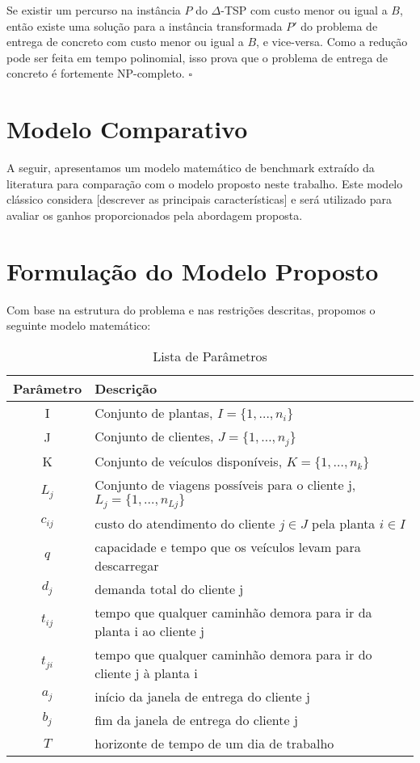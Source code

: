 Se existir um percurso na inst\^{a}ncia $P$ do $\Delta$-TSP com custo menor ou igual a $B$, ent\~{a}o existe uma solu\c{c}\~{a}o para a inst\^{a}ncia transformada $P'$ do problema de entrega de concreto com custo menor ou igual a $B$, e vice-versa. Como a redu\c{c}\~{a}o pode ser feita em tempo polinomial, isso prova que o problema de entrega de concreto \'{e} fortemente NP-completo. \hfill $\square$

\section*{Modelo Comparativo}

A seguir, apresentamos um modelo matem\'{a}tico de benchmark extra\'{i}do da literatura para compara\c{c}\~{a}o com o modelo proposto neste trabalho. Este modelo cl\'{a}ssico considera [descrever as principais caracter\'{i}sticas] e ser\'{a} utilizado para avaliar os ganhos proporcionados pela abordagem proposta.


\section*{Formula\c{c}\~{a}o do Modelo Proposto}

Com base na estrutura do problema e nas restri\c{c}\~{o}es descritas, propomos o seguinte modelo matem\'{a}tico:

\begin{table}[ht!]
  \centering
  \begin{tabular}{cl}
  \toprule
  \textbf{Parâmetro} & \textbf{Descrição} \\
  \hline
  I & Conjunto de plantas, $I=\{1,\ldots,n_i\}$\\
  J & Conjunto de clientes, $J = \{1,\ldots,n_j\}$ \\
  K & Conjunto de veículos disponíveis, $K=\{1,\ldots,n_k\}$\\
  $L_j$ & Conjunto de viagens possíveis para o cliente j, $L_j=\{1,\ldots,n_{Lj}\}$\\
  $c_{ij}$ & custo do atendimento do cliente $j\in J$ pela planta $i\in I$ \\
  $q$ & capacidade e tempo que os veículos levam para descarregar \\
  $d_{j}$ & demanda total do cliente j \\
  $t_{ij}$ & tempo que qualquer caminhão demora para ir da planta i ao cliente j \\
  $t_{ji}$ & tempo que qualquer caminhão demora para ir do cliente j à planta i \\
  $a_{j}$ & início da janela de entrega do cliente j \\
  $b_{j}$ & fim da janela de entrega do cliente j\\
  $T$ & horizonte de tempo de um dia de trabalho \\
  \hline
  \end{tabular}
  \caption{Lista de Parâmetros}
  \label{tab:parametros}
\end{table}


